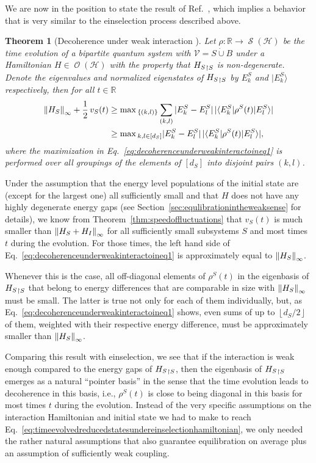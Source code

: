 \documentclass[a4paper,12pt,listof=totoc,index=totoc,bibliography=totoc,headsepline=false,headings=normal,BCOR16.153846mm,DIV12,headinclude,twoside,cleardoublepage=empty,numbers=noenddot,final]{scrreprt}
\theoremstyle{mystyle}
\numberwithin{equation}{section}
\numberwithin{figure}{section}
\numberwithin{lemma}{section}
\newtheorem{theorem}{Theorem}
\numberwithin{theorem}{section}
\numberwithin{corollary}{section}
\numberwithin{definition}{section}
\numberwithin{conjecture}{section}
\numberwithin{observation}{section}
\newcommand{\+}{\mkern2mu}
\newcommand{\dunion}{\mathbin{\dot{\cup}}}
\newcommand{\floor}[1]{\left\lfloor #1 \right\rfloor}
\newcommand{\texteqref}[1]{Eq.~\eqref{#1}}
\renewcommand{\max}{\mathchoice{\operatorname*{max}}{\operatorname*{max}}{\mathrm{max}}{\mathrm{max}}} %
\renewcommand{\H}{H}
\newcommand{\Vset}{\mathcal{V}}
\newcommand{\bra}[1]{\langle #1|}
\newcommand{\ket}[1]{|#1\rangle}
\newcommand{\norm}[2][]{
  \ifthenelse{\equal{#1}{}}
    {\left\| {#2} \right\|}
    {\ifthenelse{\equal{#1}{uinv}}
      {\left\vert\kern-0.25ex\left\vert\kern-0.25ex\left\vert {#2} \right\vert\kern-0.25ex\right\vert\kern-0.25ex\right\vert}
      {\left\| {#2} \right\|_{#1}}
    }
}
\newcommand{\trunc}[2]{{#1}_{\upharpoonright \mathnormal{#2}}}
\DeclareMathOperator{\1}{\mathds{1}}
\DeclareMathOperator{\Obs}{\mathcal{O}}
\DeclareMathOperator{\Qst}{\mathcal{S}}
\newcommand{\mc}[1]{\mathcal{#1}}
\newcommand{\mcH}{\mc{H}}
\newcommand{\mb}[1]{\mathbb{#1}}
\newcommand{\R}{\mb{R}}
\begin{document}
We are now in the position to state the result of Ref.~\cite{PhysRevE.81.05-1}, which implies a behavior that is very similar to the einselection process described above.
\begin{theorem}[Decoherence under weak interaction \cite{PhysRevE.81.05-1}] \label{thm:decoherenceunderweakinteractoin}
  Let $\rho \colon \R \to \Qst(\mcH)$ be the time evolution of a bipartite quantum system with $\Vset = S \dunion B$ under a Hamiltonian $\H \in \Obs(\mcH)$ with the property that $\trunc{\H_S} S$ is non-degenerate.
  Denote the eigenvalues and normalized eigenstates of $\trunc{\H_S} S$ by $E^S_k$ and $\ket{E^S_k}$ respectively, then for all $t \in \R$
  \begin{align}
    \norm[\infty]{\H_S} + \frac{1}{2}\,v_S(t) &\geq \max_{\{(k,l)\}} \sum_{(k,l)} |E^S_k - E^S_l|\,|\bra{E^S_k} \rho^S(t) \ket{E^S_l}| \label{eq:decoherenceunderweakinteractoineq1}\\
    &\geq \max_{k,l\in[d_S]} |E^S_k - E^S_l|\, |\bra{E^S_k} \rho^S(t) \ket{E^S_l}| , \label{eq:decoherenceunderweakinteractoineq2}
  \end{align}
  where the maximization in \texteqref{eq:decoherenceunderweakinteractoineq1} is performed over all groupings of the elements of $[d_S]$ into disjoint pairs $(k,l)$.
\end{theorem}

Under the assumption that the energy level populations of the initial state are (except for the largest one) all sufficiently small and that $\H$ does not have any highly degenerate energy gaps (see Section~\ref{sec:equlibrationintheweaksense} for details), we know from Theorem~\ref{thm:speedoffluctuations} that $v_S(t)$ is much smaller than $\norm[\infty]{\H_S+\H_I}$ for all sufficiently small subsystems $S$ and most times $t$ during the evolution.
For those times, the left hand side of \texteqref{eq:decoherenceunderweakinteractoineq1} is approximately equal to $\norm[\infty]{\H_S}$.

Whenever this is the case, all off-diagonal elements of $\rho^S(t)$ in the eigenbasis of $\trunc{\H_S} S$ that belong to energy differences that are comparable in size with $\norm[\infty]{\H_S}$ must be small.
The latter is true not only for each of them individually, but, as \texteqref{eq:decoherenceunderweakinteractoineq1} shows, even sums of up to $\floor{d_S/2}$ of them, weighted with their respective energy difference, must be approximately smaller than $\norm[\infty]{\H_S}$.

Comparing this result with einselection, we see that if the interaction is weak enough compared to the energy gaps of $\trunc{\H_S} S$, then the eigenbasis of $\trunc{\H_S} S$ emerges as a natural ``pointer basis'' in the sense that the time evolution leads to decoherence in this basis, i.e., $\rho^S(t)$ is close to being diagonal in this basis for most times $t$ during the evolution.
Instead of the very specific assumptions on the interaction Hamiltonian and initial state we had to make to reach \texteqref{eq:timeevolvedreducedstatesundereinselectionhamiltonian}, we only needed the rather natural assumptions that also guarantee equilibration on average plus an assumption of sufficiently weak coupling.
\end{document}
